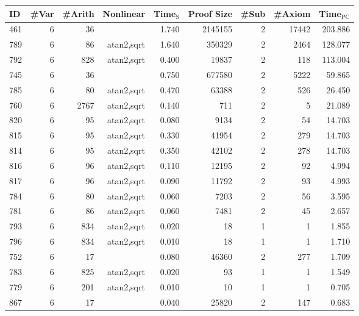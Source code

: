 \begin{table}[h!]
  \begin{center}
\begin{tabular}{|l||r|r|r||r|r|r|r|r|}
\hline
ID & \#Var & \#Arith & Nonlinear & Time$_{\text{S}}$ & Proof Size & \#Sub & \#Axiom & Time$_{\text{PC}}$ \\
\hline
\hline
461 & 6 & 36 &  & 1.740 & 2145155 & 2 & 17442 & 203.886 \\
789 & 6 & 86 & atan2,sqrt & 1.640 & 350329 & 2 & 2464 & 128.077 \\
792 & 6 & 828 & atan2,sqrt & 0.400 & 19837 & 2 & 118 & 113.004 \\
745 & 6 & 36 &  & 0.750 & 677580 & 2 & 5222 & 59.865 \\
785 & 6 & 80 & atan2,sqrt & 0.470 & 63388 & 2 & 526 & 26.450 \\
760 & 6 & 2767 & atan2,sqrt & 0.140 & 711 & 2 & 5 & 21.089 \\
820 & 6 & 95 & atan2,sqrt & 0.080 & 9134 & 2 & 54 & 14.703 \\
815 & 6 & 95 & atan2,sqrt & 0.330 & 41954 & 2 & 279 & 14.703 \\
814 & 6 & 95 & atan2,sqrt & 0.350 & 42102 & 2 & 278 & 14.703 \\
816 & 6 & 96 & atan2,sqrt & 0.110 & 12195 & 2 & 92 & 4.994 \\
817 & 6 & 96 & atan2,sqrt & 0.090 & 11792 & 2 & 93 & 4.993 \\
784 & 6 & 80 & atan2,sqrt & 0.060 & 7203 & 2 & 56 & 3.595 \\
781 & 6 & 86 & atan2,sqrt & 0.060 & 7481 & 2 & 45 & 2.657 \\
793 & 6 & 834 & atan2,sqrt & 0.020 & 18 & 1 & 1 & 1.855 \\
796 & 6 & 834 & atan2,sqrt & 0.010 & 18 & 1 & 1 & 1.710 \\
752 & 6 & 17 &  & 0.080 & 46360 & 2 & 277 & 1.709 \\
783 & 6 & 825 &atan2,sqrt & 0.020 & 93 & 1 & 1 & 1.549 \\
779 & 6 & 201 & atan2,sqrt & 0.010 & 10 & 1 & 1 & 0.705 \\
867 & 6 & 17 &  & 0.040 & 25820 & 2 & 147 & 0.683 \\

\end{tabular}
\end{center}
\end{table}
